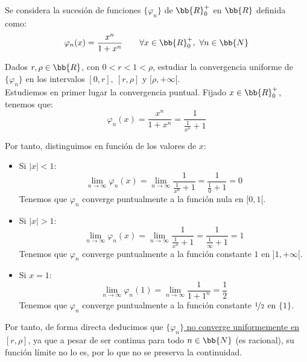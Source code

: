 \begin{ejercicio}
    Se considera la sucesión de funciones $\{\varphi_n\}$ de $\bb{R}_0^+$ en $\bb{R}$ definida como:
    \begin{equation*}
        \varphi_n(x) = \frac{x^n}{1+x^n} \qquad \forall x\in \bb{R}_0^+,~\forall n\in \bb{N}
    \end{equation*}

    Dados $r,\rho\in \bb{R}$, con $0<r<1<\rho$, estudiar la convergencia uniforme de $\{\varphi_n\}$ en los intervalos $[0,r],~[r,\rho]$ y $[\rho,+\infty[$.\\

    Estudiemos en primer lugar la convergencia puntual. Fijado $x\in \bb{R}_0^+$, tenemos que:
    \begin{equation*}
        \varphi_n(x) = \frac{x^n}{1+x^n} = \frac{1}{\frac{1}{x^n}+1}
    \end{equation*}

    Por tanto, distinguimos en función de los valores de $x$:
    \begin{itemize}
        \item Si $|x|<1$:
        \begin{equation*}
            \lim_{n\to \infty} \varphi_n(x) = \lim_{n\to \infty} \frac{1}{\frac{1}{x^n}+1} = \frac{1}{\frac{1}{0}+1} = 0
        \end{equation*}
        Tenemos que $\varphi_n$ converge puntualmente a la función nula en $[0,1[$.

        \item Si $|x|>1$:
        \begin{equation*}
            \lim_{n\to \infty} \varphi_n(x) = \lim_{n\to \infty} \frac{1}{\frac{1}{x^n}+1} = \frac{1}{\frac{1}{\infty}+1} = 1
        \end{equation*}
        Tenemos que $\varphi_n$ converge puntualmente a la función constante $1$ en $]1,+\infty[$.

        \item Si $x=1$:
        \begin{equation*}
            \lim_{n\to \infty} \varphi_n(1) = \lim_{n\to \infty} \frac{1}{1+1^n} = \frac{1}{2}
        \end{equation*}
        Tenemos que $\varphi_n$ converge puntualmente a la función constante $\nicefrac{1}{2}$ en $\{1\}$.
    \end{itemize}

    Por tanto, de forma directa deducimos que \ul{$\{\varphi_n\}$ no converge uniformemente en $[r,\rho]$}, ya que
    a pesar de ser continua para todo $n\in \bb{N}$ (es racional), su función límite no lo es, por lo que no se preserva la continuidad.


\end{ejercicio}
